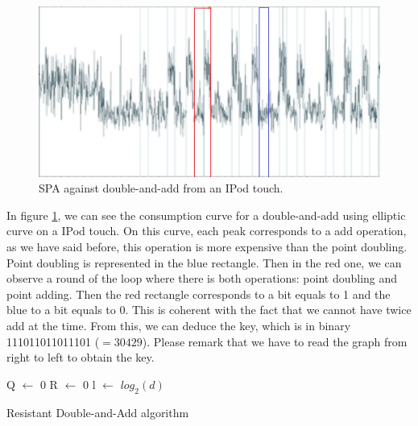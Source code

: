 \documentclass[journal]{IEEEtran}
\begin{document}
\begin{figure}[h]
   \includegraphics[scale=0.65]{spa.png}
   \caption{\label{spa.png} SPA against double-and-add from an IPod touch.}
\end{figure}

In figure \ref{spa.png}, we can see the consumption curve for a double-and-add using elliptic curve on a IPod touch. On this curve, each peak corresponds to a add operation, as we have said before, this operation is more expensive than the point doubling. Point doubling is represented in the blue rectangle. Then in the red one, we can observe a round of the loop where there is both operations: point doubling and point adding. Then the red rectangle corresponds to a bit equals to 1 and the blue to a bit equals to 0. This is coherent with the fact that we cannot have twice add at the time. From this, we can deduce the key, which is in binary 111011011011101 ($=30429$). Please remark that we have to read the graph from right to left to obtain the key.\\


\begin{algorithm}
    \SetAlgoLined %
   
    \SetSideCommentLeft 
    \SetNoFillComment

    
    
    Q $\leftarrow$ 0\;
    R $\leftarrow$ 0\;
    l $\leftarrow$ $log_2(d)$\;

    \bigskip

    \caption{Resistant Double-and-Add algorithm}
    \label{resistent-daa}
\end{algorithm}
\end{document}
